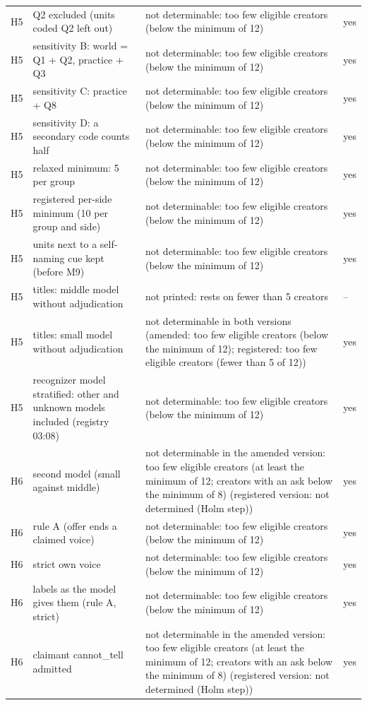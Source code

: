 {\begin{tabular}{@{}lp{}p{}l@{}}
H5 & Q2 excluded (units coded Q2 left out) & not determinable: too few eligible creators (below the minimum of 12) & yes \\
H5 & sensitivity B: world = Q1 + Q2, practice + Q3 & not determinable: too few eligible creators (below the minimum of 12) & yes \\
H5 & sensitivity C: practice + Q8 & not determinable: too few eligible creators (below the minimum of 12) & yes \\
H5 & sensitivity D: a secondary code counts half & not determinable: too few eligible creators (below the minimum of 12) & yes \\
H5 & relaxed minimum: 5 per group & not determinable: too few eligible creators (below the minimum of 12) & yes \\
H5 & registered per-side minimum (10 per group and side) & not determinable: too few eligible creators (below the minimum of 12) & yes \\
H5 & units next to a self-naming cue kept (before M9) & not determinable: too few eligible creators (below the minimum of 12) & yes \\
H5 & titles: middle model without adjudication & not printed: rests on fewer than 5 creators & -- \\
H5 & titles: small model without adjudication & not determinable in both versions (amended: too few eligible creators (below the minimum of 12); registered: too few eligible creators (fewer than 5 of 12)) & yes \\
H5 & recognizer model stratified: other and unknown models included (registry 03:08) & not determinable: too few eligible creators (below the minimum of 12) & yes \\
H6 & second model (small against middle) & not determinable in the amended version: too few eligible creators (at least the minimum of 12; creators with an ask below the minimum of 8) (registered version: not determined (Holm step)) & yes \\
H6 & rule A (offer ends a claimed voice) & not determinable: too few eligible creators (below the minimum of 12) & yes \\
H6 & strict own voice & not determinable: too few eligible creators (below the minimum of 12) & yes \\
H6 & labels as the model gives them (rule A, strict) & not determinable: too few eligible creators (below the minimum of 12) & yes \\
H6 & claimant cannot\_tell admitted & not determinable in the amended version: too few eligible creators (at least the minimum of 12; creators with an ask below the minimum of 8) (registered version: not determined (Holm step)) & yes \\

\end{tabular}}
